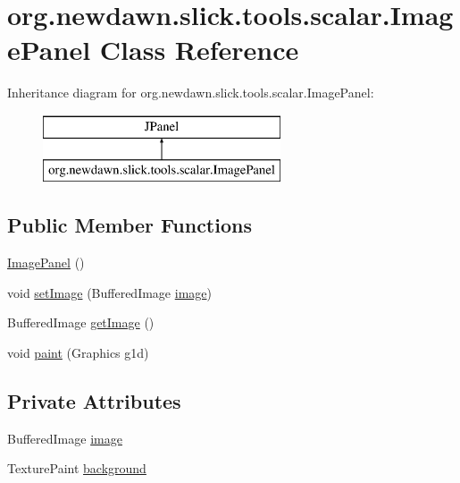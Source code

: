 \hypertarget{classorg_1_1newdawn_1_1slick_1_1tools_1_1scalar_1_1_image_panel}{}\section{org.\+newdawn.\+slick.\+tools.\+scalar.\+Image\+Panel Class Reference}
\label{classorg_1_1newdawn_1_1slick_1_1tools_1_1scalar_1_1_image_panel}
Inheritance diagram for org.\+newdawn.\+slick.\+tools.\+scalar.\+Image\+Panel\+:\begin{figure}[H]
\begin{center}
\leavevmode
\includegraphics[height=2.000000cm]{classorg_1_1newdawn_1_1slick_1_1tools_1_1scalar_1_1_image_panel}
\end{center}
\end{figure}
\subsection*{Public Member Functions}
\begin{DoxyCompactItemize}
\item 
\mbox{\hyperlink{classorg_1_1newdawn_1_1slick_1_1tools_1_1scalar_1_1_image_panel_a16d430ed788aeb27eca48c0e1edd3461}{Image\+Panel}} ()
\item 
void \mbox{\hyperlink{classorg_1_1newdawn_1_1slick_1_1tools_1_1scalar_1_1_image_panel_a16339485944d8c28fc4c198f5fc21705}{set\+Image}} (Buffered\+Image \mbox{\hyperlink{classorg_1_1newdawn_1_1slick_1_1tools_1_1scalar_1_1_image_panel_aecb459cf2f3adb87a772fdd4db61c191}{image}})
\item 
Buffered\+Image \mbox{\hyperlink{classorg_1_1newdawn_1_1slick_1_1tools_1_1scalar_1_1_image_panel_af4f896a1413288f465a7651d4c562c3c}{get\+Image}} ()
\item 
void \mbox{\hyperlink{classorg_1_1newdawn_1_1slick_1_1tools_1_1scalar_1_1_image_panel_a31911cc2a658b2067bde89799352ec90}{paint}} (Graphics g1d)
\end{DoxyCompactItemize}
\subsection*{Private Attributes}
\begin{DoxyCompactItemize}
\item 
Buffered\+Image \mbox{\hyperlink{classorg_1_1newdawn_1_1slick_1_1tools_1_1scalar_1_1_image_panel_aecb459cf2f3adb87a772fdd4db61c191}{image}}
\item 
Texture\+Paint \mbox{\hyperlink{classorg_1_1newdawn_1_1slick_1_1tools_1_1scalar_1_1_image_panel_a79f834ce107fe8e724112271649f0af8}{background}}
\end{DoxyCompactItemize}


